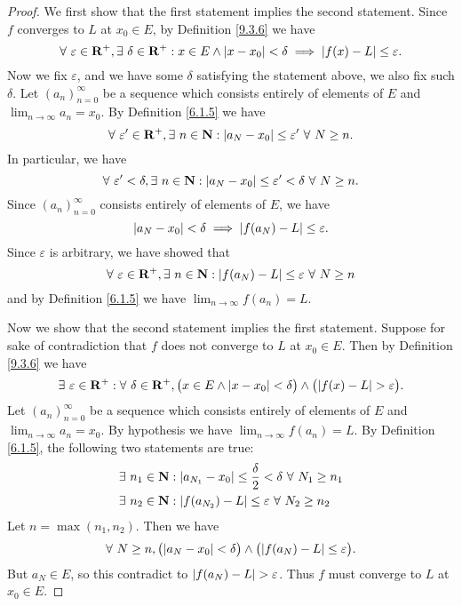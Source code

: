 \begin{proof}
    We first show that the first statement implies the second statement.
    Since \(f\) converges to \(L\) at \(x_0 \in E\), by Definition \ref{9.3.6} we have
    \[
        \forall\ \varepsilon \in \mathbf{R}^+, \exists\ \delta \in \mathbf{R}^+ : x \in E \land \abs*{x - x_0} < \delta \implies \abs*{f(x) - L} \leq \varepsilon.
    \]
    Now we fix \(\varepsilon\), and we have some \(\delta\) satisfying the statement above, we also fix such \(\delta\).
    Let \((a_n)_{n = 0}^\infty\) be a sequence which consists entirely of elements of \(E\) and \(\lim_{n \to \infty} a_n = x_0\).
    By Definition \ref{6.1.5} we have
    \[
        \forall\ \varepsilon' \in \mathbf{R}^+, \exists\ n \in \mathbf{N} : \abs*{a_N - x_0} \leq \varepsilon' \ \forall\ N \geq n.
    \]
    In particular, we have
    \[
        \forall\ \varepsilon' < \delta, \exists\ n \in \mathbf{N} : \abs*{a_N - x_0} \leq \varepsilon' < \delta \ \forall\ N \geq n.
    \]
    Since \((a_n)_{n = 0}^\infty\) consists entirely of elements of \(E\), we have
    \[
        \abs*{a_N - x_0} < \delta \implies \abs*{f(a_N) - L} \leq \varepsilon.
    \]
    Since \(\varepsilon\) is arbitrary, we have showed that
    \[
        \forall\ \varepsilon \in \mathbf{R}^+, \exists\ n \in \mathbf{N} : \abs*{f(a_N) - L} \leq \varepsilon \ \forall\ N \geq n
    \]
    and by Definition \ref{6.1.5} we have \(\lim_{n \to \infty} f(a_n) = L\).

    Now we show that the second statement implies the first statement.
    Suppose for sake of contradiction that \(f\) does not converge to \(L\) at \(x_0 \in E\).
    Then by Definition \ref{9.3.6} we have
    \[
        \exists\ \varepsilon \in \mathbf{R}^+ : \forall\ \delta \in \mathbf{R}^+, \big(x \in E \land \abs*{x - x_0} < \delta\big) \land \big(\abs*{f(x) - L} > \varepsilon\big).
    \]
    Let \((a_n)_{n = 0}^\infty\) be a sequence which consists entirely of elements of \(E\) and \(\lim_{n \to \infty} a_n = x_0\).
    By hypothesis we have \(\lim_{n \to \infty} f(a_n) = L\).
    By Definition \ref{6.1.5}, the following two statements are true:
    \begin{align*}
         & \exists\ n_1 \in \mathbf{N} : \abs*{a_{N_1} - x_0} \leq \frac{\delta}{2} < \delta \ \forall\ N_1 \geq n_1 \\
         & \exists\ n_2 \in \mathbf{N} : \abs*{f(a_{N_2}) - L} \leq \varepsilon \ \forall\ N_2 \geq n_2
    \end{align*}
    Let \(n = \max(n_1, n_2)\).
    Then we have
    \[
        \forall\ N \geq n, \big(\abs*{a_N - x_0} < \delta\big) \land \big(\abs*{f(a_N) - L} \leq \varepsilon\big).
    \]
    But \(a_N \in E\), so this contradict to \(\abs*{f(a_N) - L} > \varepsilon\).
    Thus \(f\) must converge to \(L\) at \(x_0 \in E\).
\end{proof}